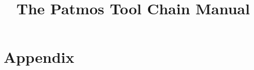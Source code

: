 \documentclass[11pt,twoside,a4paper]{report}
\title{The Patmos Tool Chain Manual}
\begin{document}
\maketitle

\newpage
\tableofcontents

\newpage

\cleardoublepage








\chapter*{Appendix}

\appendix

%



\cleardoublepage

\nocite{Kirner:RTS2010}
\nocite{FFY05}
\nocite{patmos:ppes2011}




\end{document}

